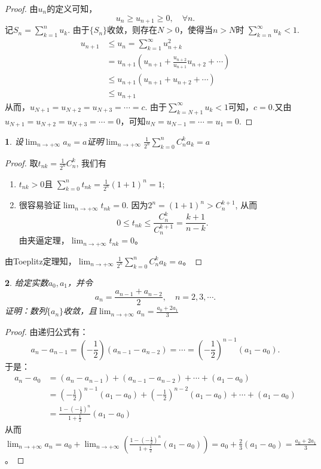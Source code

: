\documentclass[utf8]{book}
\newtheorem{example}{}[section]             %
\begin{document}
\begin{proof}
由$u_n$的定义可知，
$$u_n \geq u_{n+1}\geq 0, \quad\forall n.$$
记$S_n = \displaystyle\sum_{k=1}^{n}u_{k}$. 由于$\{S_n\}$收敛，则存在$N > 0$，使得当$n>N$时
$\displaystyle\sum_{k=n}^{\infty}u_{k} < 1$.
\begin{equation*}
\begin{split}
u_{n+1} &\leq u_{n}= \displaystyle\sum_{k=1}^{\infty}u^2_{n+k} \\
&= u_{n+1}\left(u_{n+1} + \frac{u_{n+2}}{u_{n+1}}u_{n+2} +\cdots\right)\\
&\leq u_{n+1}(u_{n+1} + u_{n+2}+\cdots)\\
&\leq u_{n+1}
\end{split}
\end{equation*}
从而，$u_{N+1}=u_{N+2}=u_{N+3}=\cdots = c$. 由于$\displaystyle\sum_{k=N+1}^{\infty}u_{k} < 1$可知，$c=0$.又由$u_{N+1}=u_{N+2}=u_{N+3}=\cdots = 0$，可知$u_N = u_{N-1} = \cdots = u_1 = 0$.
\end{proof}
\begin{example}
设$\displaystyle\lim_{n\to +\infty}a_n =a$证明$\displaystyle\lim_{n\to +\infty}\frac{1}{2^n}\displaystyle\sum_{k=0}^nC_n^ka_k =a$
\end{example}
\begin{proof}
取$t_{nk} = \frac{1}{2^n}C_n^k$, 我们有
\renewcommand\labelenumi{\normalfont(\theenumi)}
\begin{enumerate}
\item $t_{nk} > 0$且 $\displaystyle\sum_{k=0}^nt_{nk} = \frac{1}{2^n}(1+1)^n = 1$;
\item 很容易验证$\displaystyle\lim_{n\to +\infty}t_{nk} = 0$. 因为$2^n=(1+1)^n > C_n^{k+1}$, 从而
$$0\leq t_{nk} \leq \frac{C_n^k}{C_n^{k+1}} = \frac{k+1}{n-k}.$$
由夹逼定理，$\displaystyle\lim_{n\to +\infty}t_{nk} = 0$。
\end{enumerate}
由Toeplitz定理知，$\displaystyle\lim_{n\to +\infty}\frac{1}{2^n}\displaystyle\sum_{k=0}^nC_n^ka_k =a$。
\end{proof}
\begin{example}
给定实数$a_0,a_1$，并令$$a_n=\frac{a_{n-1}+a_{n-2}}{2}, \quad n = 2,3,\cdots.$$
证明：数列$\{a_n\}$收敛，且$\displaystyle\lim_{n\to +\infty}a_n =\frac{a_0+2a_1}{3}$
\end{example}
\begin{proof}
由递归公式有：
$$a_n-a_{n-1} = \left(-\frac{1}{2}\right)\left(a_{n-1}-a_{n-2}\right)=\cdots= \left(-\frac{1}{2}\right)^{n-1}(a_1-a_0).$$
于是：
\begin{equation*}
\begin{split}
a_n-a_0 &= (a_n-a_{n-1}) + (a_{n-1}-a_{n-2}) +\cdots+(a_1-a_0)\\
&=\left(-\frac{1}{2}\right)^{n-1}(a_1-a_0) + \left(-\frac{1}{2}\right)^{n-2}(a_1-a_0) + \cdots + (a_1-a_0)\\
&=\frac{1-\left(-\frac{1}{2}\right)^{n}}{1+\frac{1}{2}}(a_1-a_0)
\end{split}
\end{equation*}
从而$\displaystyle\lim_{n\to +\infty}a_n =a_0+\displaystyle\lim_{n\to +\infty}\left(\frac{1-\left(-\frac{1}{2}\right)^{n}}{1+\frac{1}{2}}(a_1-a_0)\right)=a_0+\frac{2}{3}(a_1-a_0) = \frac{a_0+2a_1}{3}$。
\end{proof}
\end{document}

